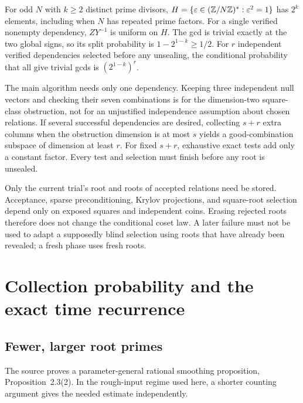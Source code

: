 For odd $N$ with $k\ge2$ distinct prime divisors,
$H=\{\varepsilon\in(\mathbb Z/N\mathbb Z)^*:\varepsilon^2=1\}$
has $2^k$ elements, including when $N$ has repeated prime factors.
For a single verified nonempty dependency, $ZY^{-1}$ is uniform
on $H$.  The gcd is trivial exactly at the two global signs,
so its split probability is $1-2^{1-k}\ge1/2$.
For $r$ independent verified dependencies selected before any
unsealing, the conditional probability that all give trivial
gcds is $(2^{1-k})^r$.

The main algorithm needs only one dependency.  Keeping three
independent null vectors and checking their seven combinations
is for the dimension-two square-class obstruction, not for an
unjustified independence assumption about chosen relations.
If several successful dependencies are desired, collecting
$s+r$ extra columns when the obstruction dimension is at most
$s$ yields a good-combination subspace of dimension at least $r$.
For fixed $s+r$, exhaustive exact tests add only a constant factor.
Every test and selection must finish before any root is unsealed.

Only the current trial's root and roots of accepted relations need
be stored.  Acceptance, sparse preconditioning, Krylov projections,
and square-root selection depend only on exposed squares and
independent coins.  Erasing rejected roots therefore does not
change the conditional coset law.  A later failure must not be
used to adapt a supposedly blind selection using roots that have
already been revealed; a fresh phase uses fresh roots.

\section{Collection probability and the exact time recurrence}
\label{rf:recurrence}

\subsection{Fewer, larger root primes}

The source proves a parameter-general rational smoothing
proposition, Proposition~2.3(2).  In the rough-input regime used
here, a shorter counting argument gives the needed estimate
independently.

